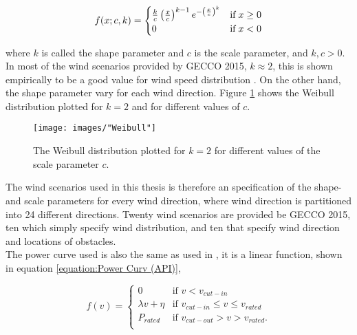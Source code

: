 \begin{equation}
f(x; c, k)  = 
\begin{cases}
\frac{k}{c} \left( \frac{x}{c} \right)^{k-1} e^{- \left( \frac{x}{c} \right)^k } & \text{if} \hspace{1mm} x \geq 0 \\
0                                                                                                                      & \text{if} \hspace{1mm}     x < 0
\end{cases}
\label{equation:Weibull}
\end{equation}


\noindent where $k$ is called the shape parameter and $c$ is the scale parameter, and $k, c > 0$. In most of the wind scenarios provided by GECCO 2015, $k \approx 2$, this is shown empirically to be a good value for wind speed distribution \citep{Justus}. On the other hand, the shape parameter vary for each wind direction. Figure \ref{figure:weibull distribution} shows the Weibull distribution plotted for $k = 2$ and for different values of $c$. \\


\begin{figure}[h!]
\begin{center}
\texttt{[image: images/"Weibull"]}
\caption{The Weibull distribution plotted for $k = 2$ for different values of the scale parameter $c$.}
\label{figure:weibull distribution}
\end{center}
\end{figure}

\noindent The wind scenarios used in this thesis is therefore an specification of the shape- and scale parameters for every wind direction, where wind direction is partitioned into 24 different directions. Twenty wind scenarios are provided be GECCO 2015, ten which simply specify wind distribution, and ten that specify wind direction and locations of obstacles. \\

\noindent The power curve used is also the same as used in \cite{Kusiak}, it is a linear function, shown in equation \ref{equation:Power Curv (API)},

\begin{equation}
 f(v) = 
  \begin{cases} 
   0                                  & \text{if }     v < v_{cut-in} \\
   \lambda v + \eta           & \text{if }     v_{cut-in} \leq v \leq v_{rated} \\
   P_{rated}                        & \text{if }     v_{cut-out} > v > v_{rated}. \\
  \end{cases}
  \label{equation:Power Curv (API)}
\end{equation}

